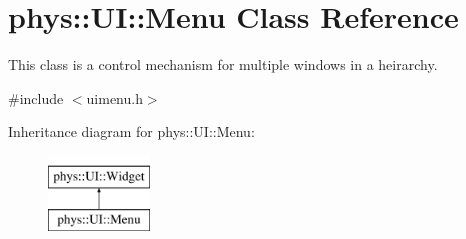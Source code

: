 \hypertarget{classphys_1_1UI_1_1Menu}{
\section{phys::UI::Menu Class Reference}
\label{d6/dd3/classphys_1_1UI_1_1Menu}
}


This class is a control mechanism for multiple windows in a heirarchy.  




{\ttfamily \#include $<$uimenu.h$>$}

Inheritance diagram for phys::UI::Menu:\begin{figure}[H]
\begin{center}
\leavevmode
\includegraphics[height=2.000000cm]{d6/dd3/classphys_1_1UI_1_1Menu}
\end{center}
\end{figure}
